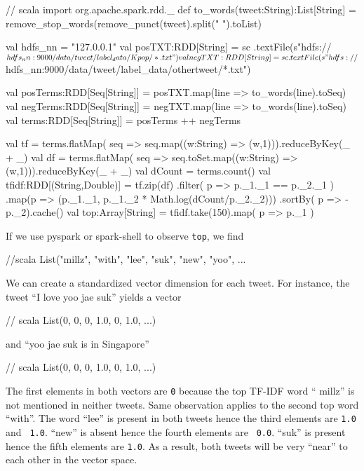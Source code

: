 \documentclass[10pt]{article}
\begin{document}
\begin{code}
// scala 
import org.apache.spark.rdd._
def to_words(tweet:String):List[String] = 
    remove_stop_words(remove_punct(tweet).split(" ").toList)

val hdfs_nn = "127.0.0.1"
val posTXT:RDD[String] = sc
    .textFile(s"hdfs://${hdfs_nn}:9000/data/tweet/label_data/Kpop/*.txt")
val negTXT:RDD[String] = sc
    .textFile(s"hdfs://${hdfs_nn}:9000/data/tweet/label_data/othertweet/*.txt")

val posTerms:RDD[Seq[String]] = posTXT.map(line => to_words(line).toSeq)
val negTerms:RDD[Seq[String]] = negTXT.map(line => to_words(line).toSeq)
val terms:RDD[Seq[String]] = posTerms ++ negTerms

val tf = terms.flatMap( seq => seq.map((w:String) => (w,1))).reduceByKey(_ + _)
val df = terms.flatMap( seq => seq.toSet.map((w:String) => (w,1))).reduceByKey(_ + _)
val dCount = terms.count()
val tfidf:RDD[(String,Double)] = tf.zip(df)
   .filter( p => p._1._1 == p._2._1 )
   .map(p => (p._1._1, p._1._2 * Math.log(dCount/p._2._2)))
   .sortBy( p => - p._2).cache()
val top:Array[String] = tfidf.take(150).map( p => p._1 )

\end{code}


If we use pyspark or spark-shell to observe {\tt top}, we find 
\begin{code}
//scala 
List("millz", "with", "lee", "suk", "new", "yoo", ...

\end{code}
%

We can create a standardized vector dimension for each tweet. For
instance, the tweet ``I love yoo jae suk'' yields a vector 
\begin{code}
// scala
List(0, 0, 0, 1.0, 0, 1.0, ...)
\end{code}
and  ``yoo jae suk is in Singapore''
\begin{code}
// scala
List(0, 0, 0, 1.0, 0, 1.0, ...)
\end{code}
%
The first elements in both vectors are {\tt 0} because the top TF-IDF word ``
  millz'' is not mentioned in neither tweets. Same observation
applies to the second top word ``with''. The word ``lee'' is present
in both tweets hence the third elements are {\tt 1.0} and {\tt
  1.0}. ``new'' is absent hence the fourth elements are {\tt
  0.0}. ``suk'' is present hence the fifth elements are {\tt 1.0}. As
a result, both tweets will be very ``near'' to each other in the
vector space.
\end{document}

